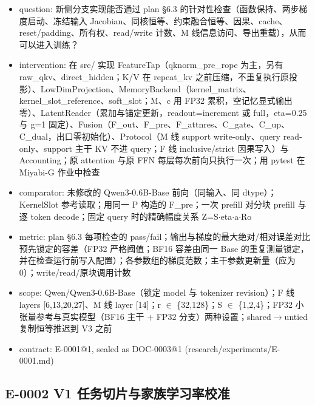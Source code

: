 \documentclass[11pt]{article}
\begin{document}
\begin{itemize}
\item question: 新侧分支实现能否通过 plan §6.3 的针对性检查（函数保持、两步梯度启动、冻结输入 Jacobian、同核恒等、约束融合恒等、因果、cache、reset/padding、所有权、read/write 计数、M 线信息访问、导出重载），从而可以进入训练？
\item intervention: 在 src/ 实现 FeatureTap（qknorm\_pre\_rope 为主，另有 raw\_qkv、direct\_hidden；K/V 在 repeat\_kv 之前压缩，不重复执行原投影）、LowDimProjection、MemoryBackend（kernel\_matrix、kernel\_slot\_reference、soft\_slot；M、c 用 FP32 累积，空记忆显式输出零）、LatentReader（累加与锚定更新，readout=increment 或 full，eta=0.25 与 g=1 固定）、Fusion（F\_out、F\_pre、F\_attnres、C\_gate、C\_up、C\_dual，出口零初始化）、Protocol（M 线 support write-only、query read-only、support 主干 KV 不进 query；F 线 inclusive/strict 因果写入）与 Accounting；原 attention 与原 FFN 每层每次前向只执行一次；用 pytest 在 Miyabi-G 作业中检查
\item comparator: 未修改的 Qwen3-0.6B-Base 前向（同输入、同 dtype）；KernelSlot 参考读取；用同一 P 构造的 F\_pre；一次 prefill 对分块 prefill 与逐 token decode；固定 query 时的精确幅度关系 Z=S\ensuremath{\cdot}eta\ensuremath{\cdot}a\ensuremath{\cdot}Ro
\item metric: plan §6.3 每项检查的 pass/fail；输出与梯度的最大绝对/相对误差对比预先锁定的容差（FP32 严格阈值；BF16 容差由同一 Base 的重复测量锁定，并在检查运行前写入配置）；各参数组的梯度范数；主干参数更新量（应为 0）；write/read/原块调用计数
\item scope: Qwen/Qwen3-0.6B-Base（锁定 model 与 tokenizer revision）；F 线 layers [6,13,20,27]、M 线 layer [14]；r \ensuremath{\in} \{32,128\}；S \ensuremath{\in} \{1,2,4\}；FP32 小张量参考与真实模型（BF16 主干 + FP32 分支）两种设置；shared\ensuremath{\rightarrow}untied 复制恒等推迟到 V3 之前
\item contract: E-0001@1, sealed as DOC-0003@1 (research/experiments/E-0001.md)
\end{itemize}

\subsection*{E-0002 V1 任务切片与家族学习率校准}
\end{document}
